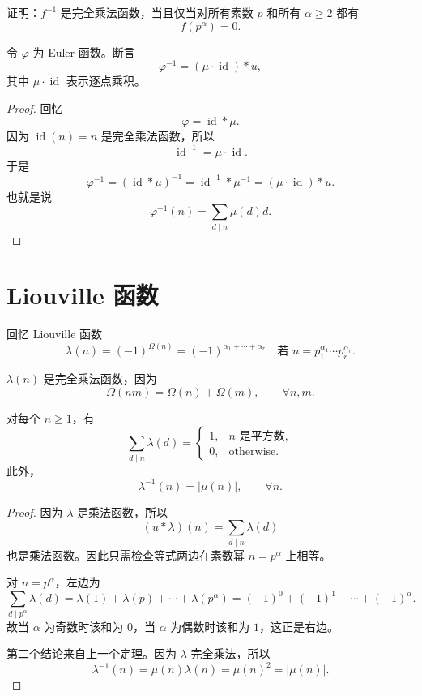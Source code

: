 \begin{exercise}
	证明：$f^{-1}$ 是完全乘法函数，当且仅当对所有素数 $p$ 和所有 $\alpha\geq 2$ 都有
	\[
		f(p^\alpha)=0.
	\]
\end{exercise}

\begin{example}
	令 $\varphi$ 为 Euler 函数。断言
	\[
		\varphi^{-1}=(\mu\cdot\operatorname{id})*u,
	\]
	其中 $\mu\cdot\operatorname{id}$ 表示逐点乘积。
\end{example}

\begin{proof}
	回忆
	\[
		\varphi=\operatorname{id}*\mu.
	\]
	因为 $\operatorname{id}(n)=n$ 是完全乘法函数，所以
	\[
		\operatorname{id}^{-1}=\mu\cdot\operatorname{id}.
	\]
	于是
	\[
		\varphi^{-1}
		=
		(\operatorname{id}*\mu)^{-1}
		=
		\operatorname{id}^{-1}*\mu^{-1}
		=
		(\mu\cdot\operatorname{id})*u.
	\]
	也就是说
	\[
		\varphi^{-1}(n)=\sum_{d\mid n}\mu(d)d.
	\]
\end{proof}

\section{Liouville 函数}

回忆 Liouville 函数
\[
	\lambda(n)=(-1)^{\Omega(n)}
	=
	(-1)^{\alpha_1+\cdots+\alpha_r}
	\quad \text{若 } n=p_1^{\alpha_1}\cdots p_r^{\alpha_r}.
\]

\begin{remark}
	$\lambda(n)$ 是完全乘法函数，因为
	\[
		\Omega(nm)=\Omega(n)+\Omega(m),\qquad \forall n,m.
	\]
\end{remark}

\begin{theorem}
	对每个 $n\geq 1$，有
	\[
		\sum_{d\mid n}\lambda(d)
		=
		\begin{cases}
			1, & n\text{ 是平方数},\\
			0, & \text{otherwise}.
		\end{cases}
	\]
	此外，
	\[
		\lambda^{-1}(n)=|\mu(n)|,\qquad \forall n.
	\]
\end{theorem}

\begin{proof}
	因为 $\lambda$ 是乘法函数，所以
	\[
		(u*\lambda)(n)=\sum_{d\mid n}\lambda(d)
	\]
	也是乘法函数。因此只需检查等式两边在素数幂 $n=p^\alpha$ 上相等。

	对 $n=p^\alpha$，左边为
	\[
		\sum_{d\mid p^\alpha}\lambda(d)
		=
		\lambda(1)+\lambda(p)+\cdots+\lambda(p^\alpha)
		=
		(-1)^0+(-1)^1+\cdots+(-1)^\alpha.
	\]
	故当 $\alpha$ 为奇数时该和为 $0$，当 $\alpha$ 为偶数时该和为 $1$，这正是右边。

	第二个结论来自上一个定理。因为 $\lambda$ 完全乘法，所以
	\[
		\lambda^{-1}(n)
		=
		\mu(n)\lambda(n)
		=
		\mu(n)^2
		=
		|\mu(n)|.
	\]
\end{proof}

